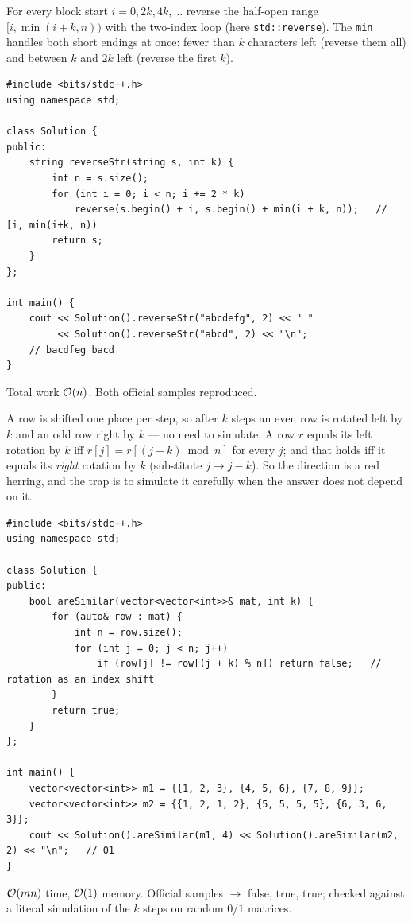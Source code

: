 \begin{solutionbox}
For every block start $i = 0, 2k, 4k, \dots$ reverse the half-open range $[i, \min(i+k, n))$ with the two-index loop (here \texttt{std::reverse}). The \texttt{min} handles both short endings at once: fewer than $k$ characters left (reverse them all) and between $k$ and $2k$ left (reverse the first $k$).
\begin{lstlisting}[style=cpp]
#include <bits/stdc++.h>
using namespace std;

class Solution {
public:
    string reverseStr(string s, int k) {
        int n = s.size();
        for (int i = 0; i < n; i += 2 * k)
            reverse(s.begin() + i, s.begin() + min(i + k, n));   // [i, min(i+k, n))
        return s;
    }
};

int main() {
    cout << Solution().reverseStr("abcdefg", 2) << " "
         << Solution().reverseStr("abcd", 2) << "\n";
    // bacdfeg bacd
}
\end{lstlisting}
\begin{center}
\end{center}
Total work $\mathcal{O}(n)$. Both official samples reproduced.
\end{solutionbox}

\begin{solutionbox}
A row is shifted one place per step, so after $k$ steps an even row is rotated left by $k$ and an odd row right by $k$ --- no need to simulate. A row $r$ equals its left rotation by $k$ iff $r[j] = r[(j + k) \bmod n]$ for every $j$; and that holds iff it equals its \emph{right} rotation by $k$ (substitute $j \to j - k$). So the direction is a red herring, and the trap is to simulate it carefully when the answer does not depend on it.
\begin{lstlisting}[style=cpp]
#include <bits/stdc++.h>
using namespace std;

class Solution {
public:
    bool areSimilar(vector<vector<int>>& mat, int k) {
        for (auto& row : mat) {
            int n = row.size();
            for (int j = 0; j < n; j++)
                if (row[j] != row[(j + k) % n]) return false;   // rotation as an index shift
        }
        return true;
    }
};

int main() {
    vector<vector<int>> m1 = {{1, 2, 3}, {4, 5, 6}, {7, 8, 9}};
    vector<vector<int>> m2 = {{1, 2, 1, 2}, {5, 5, 5, 5}, {6, 3, 6, 3}};
    cout << Solution().areSimilar(m1, 4) << Solution().areSimilar(m2, 2) << "\n";   // 01
}
\end{lstlisting}
$\mathcal{O}(mn)$ time, $\mathcal{O}(1)$ memory. Official samples $\to$ false, true, true; checked against a literal simulation of the $k$ steps on random $0/1$ matrices.
\end{solutionbox}

